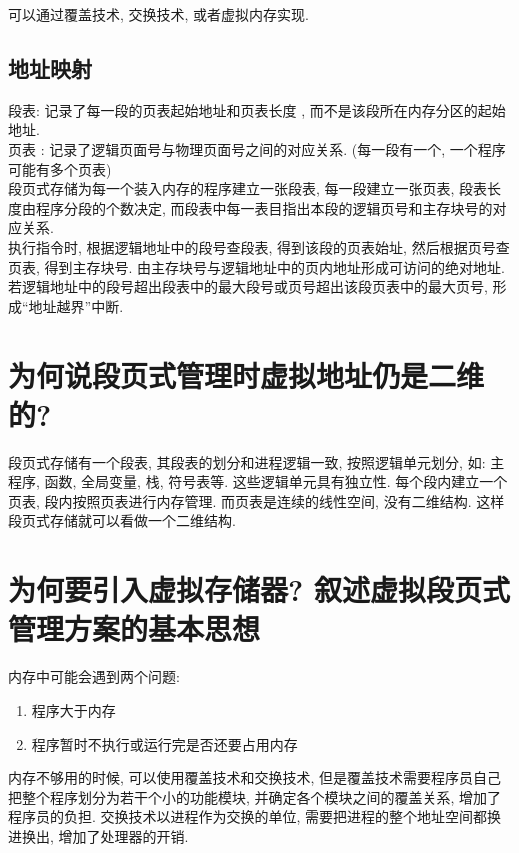 \documentclass[a4paper, 12pt, notitlepage]{article}
\begin{document}
	可以通过覆盖技术, 交换技术, 或者虚拟内存实现. 
	
\subsection{地址映射}

	段表: 记录了每一段的页表起始地址和页表长度 , 而不是该段所在内存分区的起始地址. \\
	
	页表 : 记录了逻辑页面号与物理页面号之间的对应关系. (每一段有一个, 一个程序可能有多个页表) \\
	
	段页式存储为每一个装入内存的程序建立一张段表, 每一段建立一张页表, 段表长度由程序分段的个数决定, 而段表中每一表目指出本段的逻辑页号和主存块号的对应关系. \\
	
	执行指令时, 根据逻辑地址中的段号查段表, 得到该段的页表始址, 然后根据页号查页表, 得到主存块号. 由主存块号与逻辑地址中的页内地址形成可访问的绝对地址. 若逻辑地址中的段号超出段表中的最大段号或页号超出该段页表中的最大页号, 形成“地址越界”中断. 
	
\section{为何说段页式管理时虚拟地址仍是二维的?}

	段页式存储有一个段表, 其段表的划分和进程逻辑一致, 按照逻辑单元划分, 如: 主程序, 函数, 全局变量, 栈, 符号表等. 	这些逻辑单元具有独立性. 每个段内建立一个页表, 段内按照页表进行内存管理. 而页表是连续的线性空间, 没有二维结构. 这样段页式存储就可以看做一个二维结构. 
	

\section{为何要引入虚拟存储器? 叙述虚拟段页式管理方案的基本思想}

	内存中可能会遇到两个问题: 
	
\begin{enumerate}
	\item 程序大于内存
	\item 程序暂时不执行或运行完是否还要占用内存
\end{enumerate}

	内存不够用的时候, 可以使用覆盖技术和交换技术, 但是覆盖技术需要程序员自己把整个程序划分为若干个小的功能模块, 并确定各个模块之间的覆盖关系, 增加了程序员的负担. 交换技术以进程作为交换的单位, 需要把进程的整个地址空间都换进换出, 增加了处理器的开销. \\
	
\end{document}
